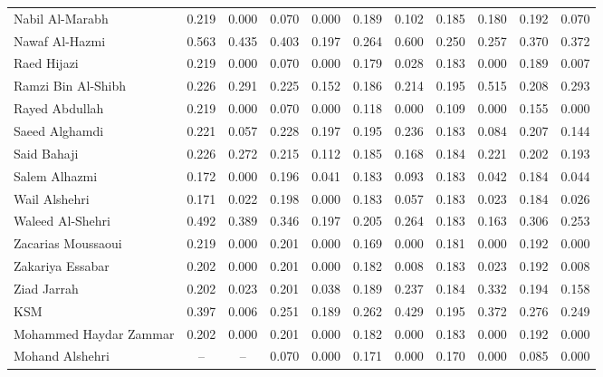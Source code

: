 \begin{subappendices}
\begin{table}
\begin{center}
\begin{tabular}{l cc cccccccc}
Nabil Al-Marabh       	& 0.219   & 0.000   & 0.070   & 0.000   & 0.189   & 0.102   & 0.185   & 0.180   & 0.192   & 0.070   \\
Nawaf Al-Hazmi        	& 0.563   & 0.435   & 0.403   & 0.197   & 0.264   & 0.600   & 0.250   & 0.257   & 0.370   & 0.372   \\
Raed Hijazi           	& 0.219   & 0.000   & 0.070   & 0.000   & 0.179   & 0.028   & 0.183   & 0.000   & 0.189   & 0.007   \\
Ramzi Bin Al-Shibh    	& 0.226   & 0.291   & 0.225   & 0.152   & 0.186   & 0.214   & 0.195   & 0.515   & 0.208   & 0.293   \\
Rayed Abdullah        	& 0.219   & 0.000   & 0.070   & 0.000   & 0.118   & 0.000   & 0.109   & 0.000   & 0.155   & 0.000   \\
Saeed Alghamdi        	& 0.221   & 0.057   & 0.228   & 0.197   & 0.195   & 0.236   & 0.183   & 0.084   & 0.207   & 0.144   \\
Said Bahaji           	& 0.226   & 0.272   & 0.215   & 0.112   & 0.185   & 0.168   & 0.184   & 0.221   & 0.202   & 0.193   \\
Salem Alhazmi         	& 0.172   & 0.000   & 0.196   & 0.041   & 0.183   & 0.093   & 0.183   & 0.042   & 0.184   & 0.044   \\
Wail Alshehri         	& 0.171   & 0.022   & 0.198   & 0.000   & 0.183   & 0.057   & 0.183   & 0.023   & 0.184   & 0.026   \\
Waleed Al-Shehri      	& 0.492   & 0.389   & 0.346   & 0.197   & 0.205   & 0.264   & 0.183   & 0.163   & 0.306   & 0.253   \\
Zacarias Moussaoui    	& 0.219   & 0.000   & 0.201   & 0.000   & 0.169   & 0.000   & 0.181   & 0.000   & 0.192   & 0.000   \\
Zakariya Essabar      	& 0.202   & 0.000   & 0.201   & 0.000   & 0.182   & 0.008   & 0.183   & 0.023   & 0.192   & 0.008   \\
Ziad Jarrah           	& 0.202   & 0.023   & 0.201   & 0.038   & 0.189   & 0.237   & 0.184   & 0.332   & 0.194   & 0.158   \\
KSM                   	& 0.397   & 0.006   & 0.251   & 0.189   & 0.262   & 0.429   & 0.195   & 0.372   & 0.276   & 0.249   \\
Mohammed Haydar Zammar	& 0.202   & 0.000   & 0.201   & 0.000   & 0.182   & 0.000   & 0.183   & 0.000   & 0.192   & 0.000   \\
Mohand Alshehri       	& --      & --      & 0.070   & 0.000   & 0.171   & 0.000   & 0.170   & 0.000   & 0.085   & 0.000   \\

\end{tabular}
\end{center}
\end{table}
\end{subappendices}
